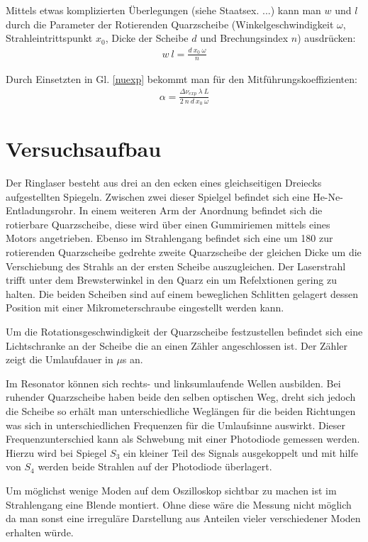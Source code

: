 \documentclass[12pt]{article}
\begin{document}
Mittels etwas komplizierten Überlegungen (siehe Staatsex. ...) kann man $w$ und $l$ durch die Parameter der Rotierenden Quarzscheibe
(Winkelgeschwindigkeit $\omega$, Strahleintrittspunkt $x_0$, Dicke der Scheibe $d$ und Brechungsindex $n$) ausdrücken:
\begin{align}
 w \ l = \frac{d \ x_0 \ \omega}{n}
\end{align}

Durch Einsetzten in Gl. \ref{nuexp} bekommt man für den Mitführungskoeffizienten:
\begin{align}
\label{mitfuehrungskoeff} \alpha = \frac{\Delta\nu_{exp} \ \lambda \ L}{2 \ n \ d \ x_0 \ \omega}
\end{align}


\section{Versuchsaufbau}
Der Ringlaser besteht aus drei an den ecken eines gleichseitigen Dreiecks aufgestellten Spiegeln. Zwischen zwei dieser Spielgel befindet sich eine He-Ne-Entladungsrohr.
In einem weiteren Arm der Anordnung befindet sich die rotierbare Quarzscheibe, diese wird über einen Gummiriemen mittels eines Motors angetrieben.
Ebenso im Strahlengang befindet sich eine um 180 zur rotierenden Quarzscheibe gedrehte zweite Quarzscheibe der gleichen Dicke um die Verschiebung des Strahls
an der ersten Scheibe auszugleichen. Der Laserstrahl trifft unter dem Brewsterwinkel in den Quarz ein um Refelxtionen gering zu halten.
Die beiden Scheiben sind auf einem beweglichen Schlitten gelagert dessen Position mit einer Mikrometerschraube eingestellt
werden kann. 

Um die Rotationsgeschwindigkeit der Quarzscheibe festzustellen befindet sich eine Lichtschranke an der Scheibe die an einen Zähler angeschlossen ist.
Der Zähler zeigt die Umlaufdauer in $\mu$s an.

Im Resonator können sich rechts- und linksumlaufende Wellen ausbilden. Bei ruhender Quarzscheibe haben beide den selben optischen Weg, dreht sich jedoch 
die Scheibe so erhält man unterschiedliche Weglängen für die beiden Richtungen was sich in unterschiedlichen Frequenzen für die Umlaufsinne auswirkt.
Dieser Frequenzunterschied kann als Schwebung mit einer Photodiode gemessen werden. Hierzu wird bei Spiegel $S_3$ ein kleiner Teil des Signals ausgekoppelt
und mit hilfe von $S_4$ werden beide Strahlen auf der Photodiode überlagert.

Um möglichst wenige Moden auf dem Oszilloskop sichtbar zu machen ist im Strahlengang eine Blende montiert. Ohne diese wäre die Messung nicht möglich da
man sonst eine irreguläre Darstellung aus Anteilen vieler verschiedener Moden erhalten würde.
\end{document}
